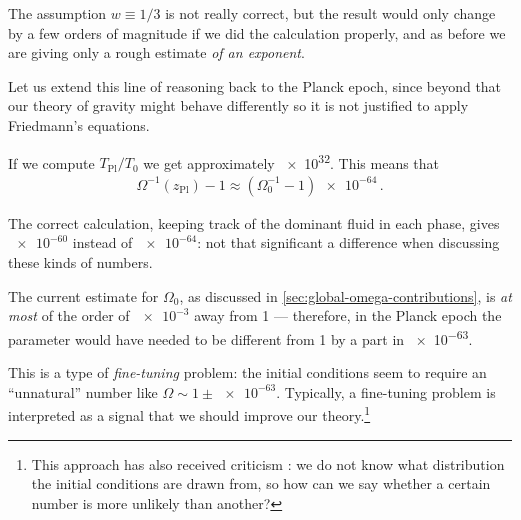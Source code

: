\documentclass[main.tex]{subfiles}
\begin{document}
The assumption \(w \equiv 1/3\) is not really correct, but the result would only change by a few orders of magnitude if we did the calculation properly, and as before we are giving only a rough estimate \emph{of an exponent}.

Let us extend this line of reasoning back to the Planck epoch, since beyond that our theory of gravity might behave differently so it is not justified to apply Friedmann's equations. 

If we compute \(T _{\text{Pl}} / T_0 \) we get approximately \num{e32}.
This means that 
%
\begin{align}
\Omega^{-1}(z_{\text{Pl}}) - 1 \approx (\Omega_0^{-1} - 1) \num{e-64}
\,.
\end{align}

The correct calculation, keeping track of the dominant fluid in each phase, gives \(\num{e-60}\) instead of \(\num{e-64}\): not that significant a difference when discussing these kinds of numbers.

The current estimate for \(\Omega_0 \), as discussed in \ref{sec:global-omega-contributions}, is \emph{at most} of the order of \(\num{e-3}\) away from 1 --- therefore, in the Planck epoch the parameter would have needed to be different from 1 by a part in \num{e-63}. 

This is a type of \emph{fine-tuning} problem: the initial conditions seem to require an ``unnatural'' number like \(\Omega \sim 1 \pm \num{e-63}\).
Typically, a fine-tuning problem is interpreted as a signal that we should improve our theory.\footnote{This approach has also received criticism \cite[sec.\ 3.2]{hossenfelderScreamsExplanationFinetuning2019}: we do not know what distribution the initial conditions are drawn from, so how can we say whether a certain number is more unlikely than another?}
\end{document}
